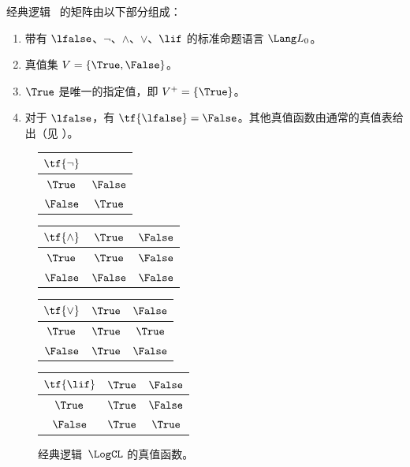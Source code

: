 \documentclass[../../../include/open-logic-section]{subfiles}
\begin{document}
\begin{ex}
经典逻辑~\LogCL{} 的矩阵由以下部分组成：
\begin{enumerate}
  \item 带有 $\lfalse$、$\lnot$、$\land$、$\lor$、$\lif$ 的标准命题语言 $\Lang L_0$。
  \item 真值集 $V = \{\True, \False\}$。
  \item $\True$ 是唯一的指定值，即 $V^+ = \{\True\}$。
  \item 对于 $\lfalse$，有 $\tf{\lfalse} = \False$。其他真值函数由通常的真值表给出（见 ）。
\end{enumerate}
\begin{figure}
  \begin{center}
      \begin{tabular}{c|c}
        $\tf{\lnot}$ & \\
        \hline
        $\True$ & $\False$ \\
        $\False$ & $\True$
      \end{tabular}
      \quad
      \begin{tabular}{c|cc}
        $\tf{\land}$ & $\True$ & $\False$ \\
        \hline
        $\True$ & $\True$ & $\False$ \\
        $\False$ & $\False$ & $\False$
      \end{tabular}
      \quad
      \begin{tabular}{c|cc}
        $\tf{\lor}$ & $\True$ & $\False$ \\
        \hline
        $\True$ & $\True$ & $\True$ \\
        $\False$ & $\True$ & $\False$
      \end{tabular}
      \quad
      \begin{tabular}{c|cc}
        $\tf{\lif}$ & $\True$ & $\False$ \\
        \hline
        $\True$ & $\True$ & $\False$ \\
        $\False$ & $\True$ & $\True$
      \end{tabular}
    \end{center}
    \caption{经典逻辑~$\LogCL$ 的真值函数。}
  \end{figure}
  \end{ex}
\end{document}
